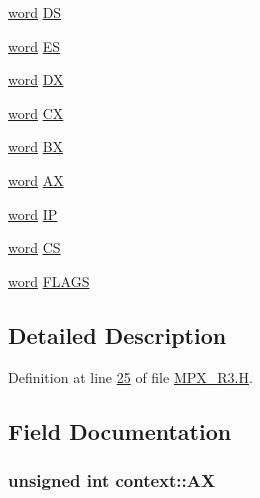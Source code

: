 \begin{DoxyCompactItemize}
\item 
\hyperlink{trmdrive_8c_a285e72252c100e2508e4e933a0738f2b}{word} \hyperlink{structcontext_ad2a3e611b78532bc1accf02c848b7599}{DS}
\item 
\hyperlink{trmdrive_8c_a285e72252c100e2508e4e933a0738f2b}{word} \hyperlink{structcontext_ae9f446d99a98ca9ca9c448a2ff4066bf}{ES}
\item 
\hyperlink{trmdrive_8c_a285e72252c100e2508e4e933a0738f2b}{word} \hyperlink{structcontext_ae026892abe9326a36108fcaeb08a4436}{DX}
\item 
\hyperlink{trmdrive_8c_a285e72252c100e2508e4e933a0738f2b}{word} \hyperlink{structcontext_ab314318f68612a50def4e9bfaca766f6}{CX}
\item 
\hyperlink{trmdrive_8c_a285e72252c100e2508e4e933a0738f2b}{word} \hyperlink{structcontext_a47b120f45dd09466883dd992e4013393}{BX}
\item 
\hyperlink{trmdrive_8c_a285e72252c100e2508e4e933a0738f2b}{word} \hyperlink{structcontext_a81fe87b5153fb61ade5c1e88a74807f4}{AX}
\item 
\hyperlink{trmdrive_8c_a285e72252c100e2508e4e933a0738f2b}{word} \hyperlink{structcontext_aed5e26918558117081c7d87f485577ee}{IP}
\item 
\hyperlink{trmdrive_8c_a285e72252c100e2508e4e933a0738f2b}{word} \hyperlink{structcontext_a7386486f860ed54d86c941394b57a34b}{CS}
\item 
\hyperlink{trmdrive_8c_a285e72252c100e2508e4e933a0738f2b}{word} \hyperlink{structcontext_ad4e1a32a11367c9584e6d0cbbde8c0de}{FLAGS}
\end{DoxyCompactItemize}


\subsection{Detailed Description}


Definition at line \hyperlink{_m_p_x___r3_8_h_source_l00025}{25} of file \hyperlink{_m_p_x___r3_8_h_source}{MPX\_\-R3.H}.



\subsection{Field Documentation}
\hypertarget{structcontext_ac566b46485abbfc32ce69987dfbd0d1f}{
\subsubsection[{AX}]{\setlength{\rightskip}{0pt plus 5cm}unsigned int {\bf context::AX}}}
\label{structcontext_ac566b46485abbfc32ce69987dfbd0d1f}


